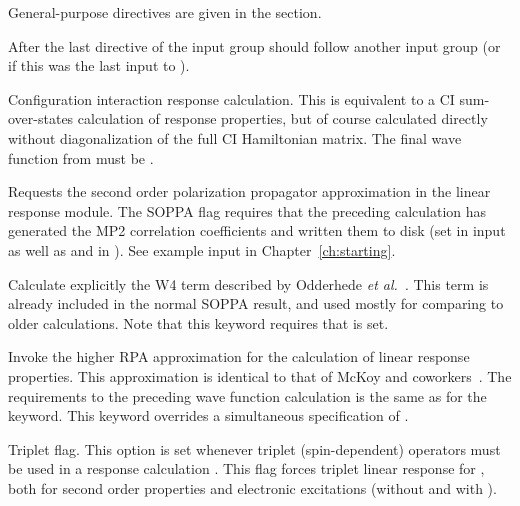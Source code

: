 General-purpose directives are given in the  section.

After the last directive of the  input group
should follow another  input group
(or  if this was the last input to \dalton).

\begin{description}

\item{}
Configuration interaction
response calculation. 
This is equivalent to a CI sum-over-states
calculation of response properties,
but of course calculated directly without diagonalization of the full
CI Hamiltonian matrix.
The final wave function from  must be .

\item{}
Requests the second order polarization propagator approximation 
in the linear response module.
The SOPPA
flag requires that
the preceding {\sir} calculation has generated the MP2 correlation
coefficients and written them to disk (set  in 
input as well as  and  in ). See
example input in Chapter~\ref{ch:starting}.

\item{}
Calculate explicitly the W4 term described by Odderhede {\it et
al.\/}~\cite{jopjdycpr2}. This term is already included in the normal
SOPPA result, and used mostly for comparing to older
calculations. Note that this keyword requires that  is set.

\item{}
Invoke the higher RPA approximation for the calculation of linear
response properties.
This approximation is identical to that of McKoy
and coworkers~\cite{jrtsvmjcp58,tsjrvmjcp58}. The requirements to the
preceding wave function 
calculation is the same as for the  keyword.
This keyword overrides a simultaneous specification of .

\item{}
Triplet flag. This option is set whenever triplet
(spin-dependent)
operators must be used in a response calculation
\cite{jodlypjjcp91,ovhapjhjajthjojcp97}.
This flag forces triplet linear response for ,
both for second order properties and electronic excitations
(without and with ).


\end{description}
